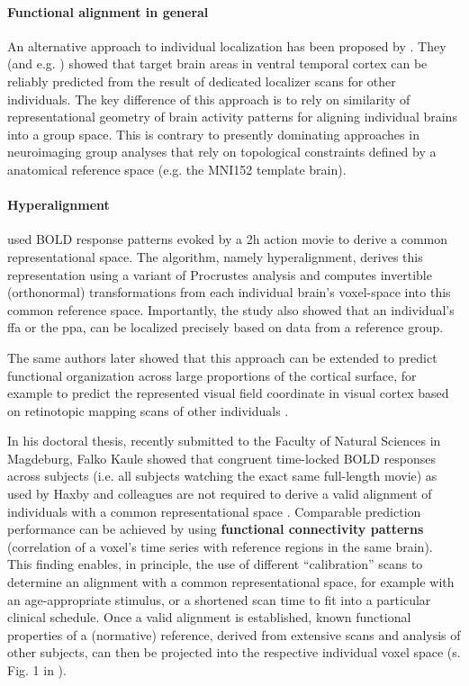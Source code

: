 \paragraph{Functional alignment in general}
%
An alternative approach to individual localization has been proposed by
\citet{haxby2011common}.
%
They (and e.g. \citet{jiahui2019predicting}) showed that target brain areas in
ventral temporal cortex can be reliably predicted from the result of dedicated
localizer scans for other individuals.
%
The key difference of this approach is to rely on similarity of representational
geometry of brain activity patterns for aligning individual brains into a group
space.
%
This is contrary to presently dominating approaches in neuroimaging group
analyses that rely on topological constraints defined by a anatomical reference
space (e.g. the MNI152 template brain).


\paragraph{Hyperalignment}
%
\citet{haxby2011common} used BOLD response patterns evoked by a 2h action movie
to derive a common representational space.
%
The algorithm, namely hyperalignment, derives this representation using a
variant of Procrustes analysis and computes invertible (orthonormal)
transformations from each individual brain’s voxel-space into this common
reference space.
%
Importantly, the study also showed that an individual's \ac{ffa} or the
\ac{ppa}, can be localized precisely based on data from a reference group.

%
The same authors later showed that this approach can be extended to predict
functional organization across large proportions of the cortical surface, for
example to predict the represented visual field coordinate in visual cortex
based on retinotopic mapping scans of other individuals
\citep{guntupalli2016model}.

%
In his doctoral thesis, recently submitted to the Faculty of Natural Sciences in
Magdeburg, Falko Kaule showed that congruent time-locked BOLD responses across
subjects (i.e. all subjects watching the exact same full-length movie) as used
by Haxby and colleagues are not required to derive a valid alignment of
individuals with a common representational space \citep{kaule2017examination}.
%
Comparable prediction performance can be achieved by using \textbf{functional
connectivity patterns} (correlation of a voxel's time series with reference
regions in the same brain).
%
This finding enables, in principle, the use of different ``calibration'' scans
to determine an alignment with a common representational space, for example with
an age-appropriate stimulus, or a shortened scan time to fit into a particular
clinical schedule.
%
Once a valid alignment is established, known functional properties of a
(normative) reference, derived from extensive scans and analysis of other
subjects, can then be projected into the respective individual voxel space (s.
Fig. 1 in \citep{nishimoto2016lining}).


